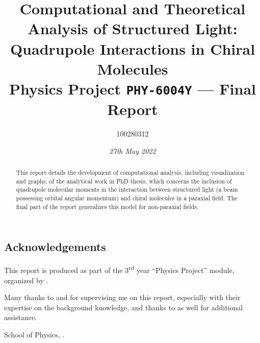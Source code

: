 \documentclass{article}
\title{\textbf{Computational and Theoretical Analysis of Structured Light: Quadrupole Interactions in Chiral Molecules} \\ {\small Physics Project \texttt{PHY-6004Y} --- Final Report} }
\date{\textit{27th May 2022}}
\author{100280312}
\begin{document}
\maketitle
\thispagestyle{empty}

\begin{abstract}
	\begin{onehalfspace}
		\noindent This report details the development of computational analysis, including visualization and graphs, of the analytical work in  PhD thesis, which concerns the inclusion of quadrupole molecular moments in the interaction between structured light (a beam possessing orbital angular momentum) and chiral molecules in a paraxial field. The final part of the report generalizes this model for non-paraxial fields.
	\end{onehalfspace}
\end{abstract}

\begin{onehalfspace}
\tableofcontents

\section*{Acknowledgements}
This report is produced as part of the 3\textsuperscript{rd} year ``Physics Project'' module, organized by .

Many thanks to  and  for supervising me on this report, especially with their expertise on the background knowledge, and thanks to  as well for additional assistance.

\vspace{5mm}

\noindent School of Physics, .
\end{onehalfspace}

\thispagestyle{empty}
\pagebreak
\end{document}
